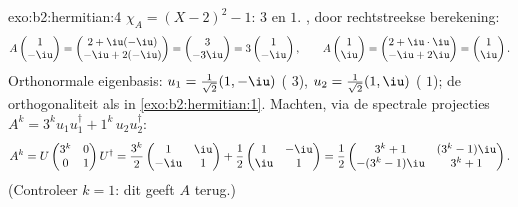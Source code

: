 \begin{solution}{exo:b2:hermitian:4}
$\chi_A = (X-2)^2 - 1$:  $3$ en $1$. ,
door rechtstreekse berekening:
\[
A\begin{pmatrix}1\\ -\iu\end{pmatrix}
= \begin{pmatrix} 2 + \iu(-\iu)\\ -\iu + 2(-\iu)\end{pmatrix}
= \begin{pmatrix} 3\\ -3\iu \end{pmatrix}
= 3\begin{pmatrix}1\\ -\iu\end{pmatrix},
\qquad
A\begin{pmatrix}1\\ \iu\end{pmatrix}
= \begin{pmatrix} 2 + \iu\cdot\iu\\ -\iu + 2\iu\end{pmatrix}
= \begin{pmatrix}1\\ \iu\end{pmatrix}.
\]
Orthonormale eigenbasis: $u_1 = \frac{1}{\sqrt2}(1, -\iu)$
( $3$), $u_2 = \frac{1}{\sqrt2}(1, \iu)$ (
$1$); de orthogonaliteit als in \cref{exo:b2:hermitian:1}. Machten,
via de spectrale projecties $A^k = 3^k u_1u_1^\dagger + 1^k\,
u_2u_2^\dagger$:
\[
A^k = U\begin{pmatrix} 3^k & 0\\ 0 & 1\end{pmatrix}U^\dagger
= \frac{3^k}{2}\begin{pmatrix} 1 & \iu\\ -\iu & 1\end{pmatrix}
+ \frac{1}{2}\begin{pmatrix} 1 & -\iu\\ \iu & 1\end{pmatrix}
= \frac12\begin{pmatrix}
3^k + 1 & (3^k - 1)\iu\\
-(3^k-1)\iu & 3^k + 1
\end{pmatrix}.
\]
(Controleer $k = 1$: dit geeft $A$ terug.)
\end{solution}

